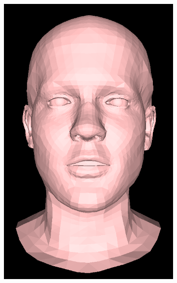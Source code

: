\begin{figure}[h]
    \centering
    \begin{subfigure}[b]{0.24\textwidth}
        \includegraphics[width=\textwidth]{figures/blendshape_interp/2/00001.png}
    \end{subfigure}
    \begin{subfigure}[b]{0.24\textwidth}

\end{subfigure}
\end{figure}
